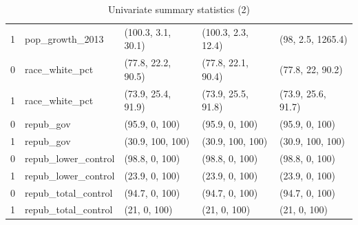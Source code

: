 \documentclass[12pt]{article}
\begin{document}
\begin{table}[ht]
\begin{tabular}{rllll}
  1 & pop\_growth\_2013 & (100.3, 3.1, 30.1) & (100.3, 2.3, 12.4) & (98, 2.5, 1265.4) \\ 
  0 & race\_white\_pct & (77.8, 22.2, 90.5) & (77.8, 22.1, 90.4) & (77.8, 22, 90.2) \\ 
  1 & race\_white\_pct & (73.9, 25.4, 91.9) & (73.9, 25.5, 91.8) & (73.9, 25.6, 91.7) \\ 
  0 & repub\_gov & (95.9, 0, 100) & (95.9, 0, 100) & (95.9, 0, 100) \\ 
  1 & repub\_gov & (30.9, 100, 100) & (30.9, 100, 100) & (30.9, 100, 100) \\ 
  0 & repub\_lower\_control & (98.8, 0, 100) & (98.8, 0, 100) & (98.8, 0, 100) \\ 
  1 & repub\_lower\_control & (23.9, 0, 100) & (23.9, 0, 100) & (23.9, 0, 100) \\ 
  0 & repub\_total\_control & (94.7, 0, 100) & (94.7, 0, 100) & (94.7, 0, 100) \\ 
  1 & repub\_total\_control & (21, 0, 100) & (21, 0, 100) & (21, 0, 100) \\
   \bottomrule
\end{tabular}
    \caption{Univariate summary statistics (2)}
    \label{tab:summarytab2}
\end{table}
\end{document}
